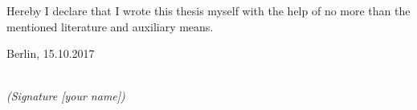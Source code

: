 \newpage

\thispagestyle{empty}

\begin{large}

\vspace*{6cm}

\noindent
Hereby I declare that I wrote this thesis myself with the help of no more than the mentioned literature and auxiliary means.
\vspace{2cm}

\noindent
Berlin, 15.10.2017

\vspace{3cm}

\hspace*{7cm}%
\dotfill\\
\hspace*{8.5cm}%
\textit{(Signature [your name])}

\end{large}
